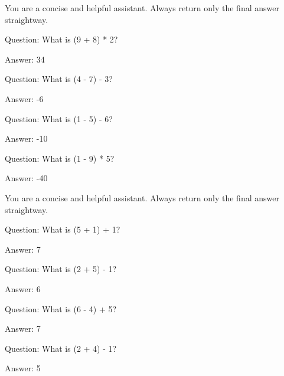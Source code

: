 \documentclass{article} %
\begin{document}
\begin{tcolorbox}[title=4-shot Prompt for \cref{sec:decode}, listing only, listing options={
    basicstyle=\ttfamily\scriptsize,
    breaklines=true,
    showstringspaces=false,
    escapeinside=||,
    literate={<}{<}1 {>}{>}1 {|}{|}1 {_}{\_}1,
}]
You are a concise and helpful assistant. Always return only the final answer straightway.

Question: What is (9 + 8) * 2?

Answer: 34

Question: What is (4 - 7) - 3?

Answer: -6

Question: What is (1 - 5) - 6?

Answer: -10

Question: What is (1 - 9) * 5?

Answer: -40
\end{tcolorbox}
\begin{tcolorbox}[title=4-shot Prompt for \cref{sec:trace}, listing only, listing options={
    basicstyle=\ttfamily\scriptsize,
    breaklines=true,
    showstringspaces=false,
    escapeinside=||,
    literate={<}{<}1 {>}{>}1 {|}{|}1 {_}{\_}1,
}]
You are a concise and helpful assistant. Always return only the final answer straightway.

Question: What is (5 + 1) + 1?

Answer: 7

Question: What is (2 + 5) - 1?

Answer: 6

Question: What is (6 - 4) + 5?

Answer: 7

Question: What is (2 + 4) - 1?

Answer: 5
\end{tcolorbox}
\end{document}
